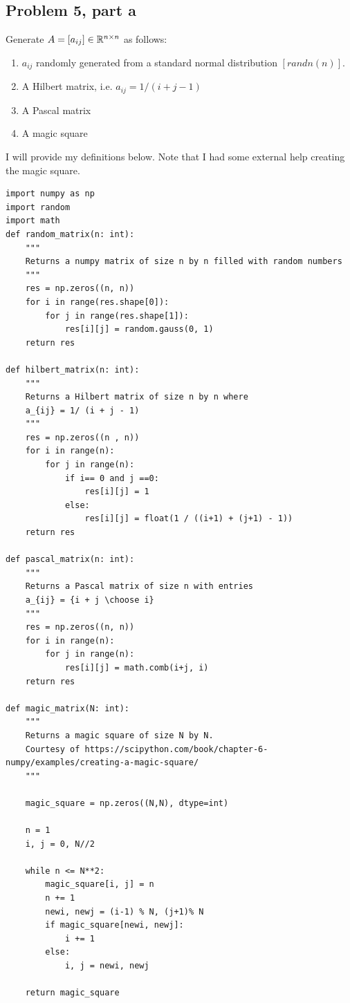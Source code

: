 \subsection{Problem 5, part a}
Generate $A = [a_{ij}] \in \mathbb{R}^{n\times n}$ as follows:
\begin{enumerate}
    \item $a_{ij}$ randomly generated from a standard normal distribution $[randn(n)]$. 
    \item A Hilbert matrix, i.e. $a_{ij} = 1/(i + j - 1)$
    \item A Pascal matrix
    \item A magic square
\end{enumerate}
\partbreak
\begin{solution}
    I will provide my definitions below. Note that I had some external help creating the magic square.

    \begin{lstlisting}
import numpy as np
import random
import math
def random_matrix(n: int):
    """
    Returns a numpy matrix of size n by n filled with random numbers 
    """
    res = np.zeros((n, n))
    for i in range(res.shape[0]):
        for j in range(res.shape[1]):
            res[i][j] = random.gauss(0, 1)
    return res

def hilbert_matrix(n: int):
    """
    Returns a Hilbert matrix of size n by n where 
    a_{ij} = 1/ (i + j - 1)
    """
    res = np.zeros((n , n))
    for i in range(n):
        for j in range(n):
            if i== 0 and j ==0:
                res[i][j] = 1
            else:
                res[i][j] = float(1 / ((i+1) + (j+1) - 1))
    return res

def pascal_matrix(n: int):
    """
    Returns a Pascal matrix of size n with entries 
    a_{ij} = {i + j \choose i}
    """
    res = np.zeros((n, n))
    for i in range(n):
        for j in range(n):
            res[i][j] = math.comb(i+j, i)
    return res

def magic_matrix(N: int):
    """
    Returns a magic square of size N by N. 
    Courtesy of https://scipython.com/book/chapter-6-numpy/examples/creating-a-magic-square/
    """

    magic_square = np.zeros((N,N), dtype=int)

    n = 1
    i, j = 0, N//2

    while n <= N**2:
        magic_square[i, j] = n
        n += 1
        newi, newj = (i-1) % N, (j+1)% N
        if magic_square[newi, newj]:
            i += 1
        else:
            i, j = newi, newj
    
    return magic_square
    \end{lstlisting}
\end{solution}
\newpage
